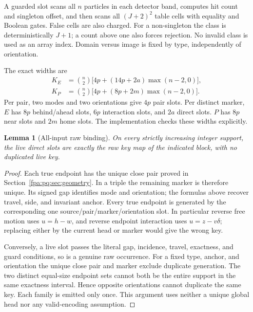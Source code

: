 \documentclass[11pt,a4paper]{article}
\numberwithin{equation}{section}
\newtheorem{lemma}[theorem]{Lemma}
\begin{document}
A guarded slot scans all $n$ particles in each detector band, computes hit count and singleton offset, and then scans all $(J+2)^2$ table cells with equality and Boolean gates. False cells are also charged. For a non-singleton the class is deterministically $J+1$; a count above one also forces rejection. No invalid class is used as an array index. Domain versus image is fixed by type, independently of orientation.

The exact widths are
\begin{align}
K_E&=\binom n2\bigl[4p+(14p+2a)\max(n-2,0)\bigr],\label{fpa:pq:eq:ke}\\
K_P&=\binom n2\bigl[4p+(8p+2m)\max(n-2,0)\bigr].\label{fpa:pq:eq:kp}
\end{align}
Per pair, two modes and two orientations give $4p$ pair slots. Per distinct marker, $E$ has $8p$ behind/ahead slots, $6p$ interaction slots, and $2a$ direct slots. $P$ has $8p$ near slots and $2m$ home slots. The implementation checks these widths explicitly.

\begin{lemma}[All-input raw binding]\label{fpa:pq:lem:raw}
On every strictly increasing integer support, the live direct slots are exactly the raw key map of the indicated block, with no duplicated live key.
\end{lemma}
\begin{proof}
Each true endpoint has the unique close pair proved in Section~\ref{fpa:pq:sec:geometry}. In a triple the remaining marker is therefore unique. Its signed gap identifies mode and orientation; the formulas above recover travel, side, and invariant anchor. Every true endpoint is generated by the corresponding one source/pair/marker/orientation slot. In particular reverse free motion uses $u=h-w$, and reverse endpoint interaction uses $u=z-v\delta$; replacing either by the current head or marker would give the wrong key.

Conversely, a live slot passes the literal gap, incidence, travel, exactness, and guard conditions, so is a genuine raw occurrence. For a fixed type, anchor, and orientation the unique close pair and marker exclude duplicate generation. The two distinct equal-size endpoint sets cannot both be the entire support in the same exactness interval. Hence opposite orientations cannot duplicate the same key. Each family is emitted only once. This argument uses neither a unique global head nor any valid-encoding assumption.
\end{proof}
\end{document}
